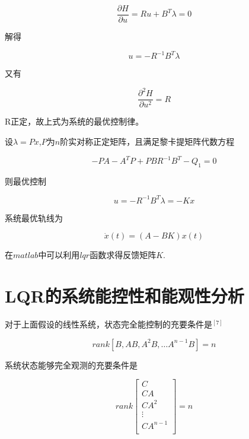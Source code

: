 \begin{equation}
\frac{\partial H}{\partial u}=Ru+B^T\lambda=0
\end{equation}

解得

\begin{equation}
u=-R^{-1}B^T\lambda
\end{equation}

又有

\begin{equation}
\frac{\partial^2 H}{\partial u^2}=R
\end{equation}

R正定，故上式为系统的最优控制律。

设$\lambda=Px$,$P$为$n$阶实对称正定矩阵，且满足黎卡提矩阵代数方程

\begin{equation}
-PA-A^TP+PBR^{-1}B^T-Q_1=0
\end{equation}

则最优控制

\begin{equation}
u=-R^{-1}B^T\lambda=-Kx
\end{equation}

系统最优轨线为

\begin{equation}
\dot x(t)=(A-BK)x(t)
\end{equation}

在$matlab$中可以利用$lqr$函数求得反馈矩阵$K$.

\section{LQR的系统能控性和能观性分析}

对于上面假设的线性系统，状态完全能控制的充要条件是$^{[7]}$

\begin{equation}
rank[B,AB,A^2B,\dots A^{n-1}B]=n
\end{equation}

系统状态能够完全观测的充要条件是

\begin{equation}
rank
\begin{bmatrix}
C\\
CA\\
CA^2\\
\vdots\\
CA^{n-1}\\
\end{bmatrix}
=n
\end{equation}

